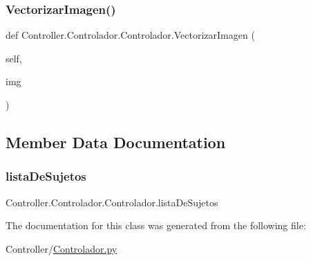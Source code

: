 \subsubsection{\texorpdfstring{Vectorizar\+Imagen()}{VectorizarImagen()}}
{\footnotesize\ttfamily def Controller.\+Controlador.\+Controlador.\+Vectorizar\+Imagen (\begin{DoxyParamCaption}\item[{}]{self,  }\item[{}]{img }\end{DoxyParamCaption})}



\subsection{Member Data Documentation}
\mbox{\label{class_controller_1_1_controlador_1_1_controlador_ac7f14b4e1c0f2bf39ef0ddf2ae687898}} 
\subsubsection{\texorpdfstring{lista\+De\+Sujetos}{listaDeSujetos}}
{\footnotesize\ttfamily Controller.\+Controlador.\+Controlador.\+lista\+De\+Sujetos}



The documentation for this class was generated from the following file\+:\begin{DoxyCompactItemize}
\item 
Controller/\hyperlink{_controlador_8py}{Controlador.\+py}\end{DoxyCompactItemize}
